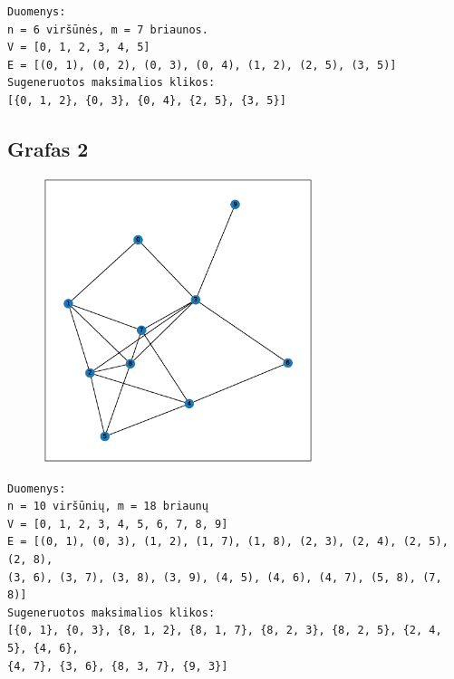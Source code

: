 \documentclass{VUMIFInfKursinis}
\begin{document}
\begin{verbatim}
Duomenys:
n = 6 viršūnės, m = 7 briaunos.
V = [0, 1, 2, 3, 4, 5]
E = [(0, 1), (0, 2), (0, 3), (0, 4), (1, 2), (2, 5), (3, 5)]
Sugeneruotos maksimalios klikos:
[{0, 1, 2}, {0, 3}, {0, 4}, {2, 5}, {3, 5}]
\end{verbatim}


\subsection{Grafas 2}
\begin{figure}[H]
  \includegraphics[height=0.7\textwidth,width=0.7\textwidth]{img/graph_2.eps}
\end{figure}

\begin{verbatim}
Duomenys:
n = 10 viršūnių, m = 18 briaunų
V = [0, 1, 2, 3, 4, 5, 6, 7, 8, 9]
E = [(0, 1), (0, 3), (1, 2), (1, 7), (1, 8), (2, 3), (2, 4), (2, 5), (2, 8),
(3, 6), (3, 7), (3, 8), (3, 9), (4, 5), (4, 6), (4, 7), (5, 8), (7, 8)]
Sugeneruotos maksimalios klikos:
[{0, 1}, {0, 3}, {8, 1, 2}, {8, 1, 7}, {8, 2, 3}, {8, 2, 5}, {2, 4, 5}, {4, 6},
{4, 7}, {3, 6}, {8, 3, 7}, {9, 3}]
\end{verbatim}
\end{document}
